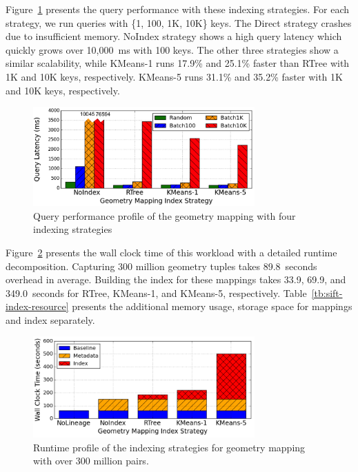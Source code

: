 \documentclass{sig-alternate}
\begin{document}
Figure~\ref{fig:sift-query} presents the query performance with these indexing strategies.
For each strategy, we run queries with \{1, 100, 1K, 10K\} keys.
The Direct strategy crashes due to insufficient memory.
NoIndex strategy shows a high query latency which quickly grows over 10,000~ms with 100 keys.
The other three strategies show a similar scalability, while KMeans-1 runs 17.9\% and 25.1\% faster than RTree with 1K and 10K keys, respectively.
KMeans-5 runs  31.1\% and 35.2\% faster with 1K and 10K keys, respectively.

\begin{figure}[t]
\begin{center}
    \includegraphics[width=85mm]{pictures/SIFTQuery-Time-tuned}
\caption {Query performance profile of the geometry mapping with four indexing strategies
    \label{fig:sift-query}
}
\end{center}
\end{figure}

Figure~\ref{fig:sift-time} presents the wall clock time of this workload with a detailed runtime decomposition. 
Capturing 300 million geometry tuples takes 89.8~seconds overhead in average. 
Building the index for these mappings takes 33.9, 69.9, and 349.0~seconds for RTree, KMeans-1, and KMeans-5, respectively.
Table~\ref{tb:sift-index-resource} presents the additional memory usage, storage space for mappings and
index separately.

\begin{figure}[t]
\begin{center}
    \includegraphics[width=85mm]{pictures/SIFTIndex-Time}
\caption {Runtime profile of the indexing strategies for geometry mapping with over 300 million pairs.
    \label{fig:sift-time}
}
\end{center}
\end{figure}
\end{document}
